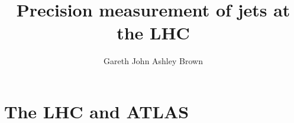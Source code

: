 \documentclass[12pt,PhD]{Thesis}
\begin{document}
\title{Precision measurement of jets at the LHC}
    \author{Gareth John Ashley Brown}

\beforeabstract
{}
    
\afterabstract
\afterpreface
%
%
%
%
%
%
%
%
%
%
%
\chapter{The LHC and ATLAS}








 
\end{document}
